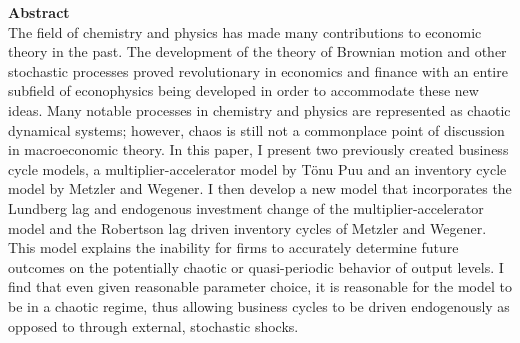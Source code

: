 \thispagestyle{plain}
\begin{center}
	\vspace*{\fill}
	\textbf{Abstract}\\
	The field of chemistry and physics has made many contributions to economic theory in the past. The development of the theory of Brownian motion and other stochastic processes proved revolutionary in economics and finance with an entire subfield of econophysics being developed in order to accommodate these new ideas. Many notable processes in chemistry and physics are represented as chaotic dynamical systems; however, chaos is still not a commonplace point of discussion in macroeconomic theory. In this paper, I present two previously created business cycle models, a multiplier-accelerator model by T\"onu Puu and an inventory cycle model by Metzler and Wegener. I then develop a new model that incorporates the Lundberg lag and endogenous investment change of the multiplier-accelerator model and the Robertson lag driven inventory cycles of Metzler and Wegener. This model explains the inability for firms to accurately determine future outcomes on the potentially chaotic or quasi-periodic behavior of output levels. I find that even given reasonable parameter choice, it is reasonable for the model to be in a chaotic regime, thus allowing business cycles to be driven endogenously as opposed to through external, stochastic shocks.
	\vspace*{\fill}
\end{center}
\pagebreak